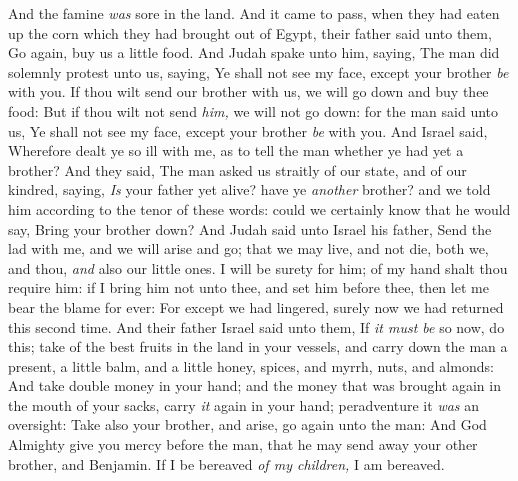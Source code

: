 \documentclass[11pt,letterpaper,oneside]{memoir}
\begin{document}
And the famine \emph{was} sore in the land. And it came to pass, when
they had eaten up the corn which they had brought out of Egypt, their
father said unto them, Go again, buy us a little food. And Judah spake
unto him, saying, The man did solemnly protest unto us, saying, Ye shall
not see my face, except your brother \emph{be} with you. If thou wilt
send our brother with us, we will go down and buy thee food: But if thou
wilt not send \emph{him,} we will not go down: for the man said unto us,
Ye shall not see my face, except your brother \emph{be} with you. And
Israel said, Wherefore dealt ye so ill with me, as to tell the man
whether ye had yet a brother? And they said, The man asked us straitly
of our state, and of our kindred, saying, \emph{Is} your father yet
alive? have ye \emph{another} brother? and we told him according to the
tenor of these words: could we certainly know that he would say, Bring
your brother down? And Judah said unto Israel his father, Send the lad
with me, and we will arise and go; that we may live, and not die, both
we, and thou, \emph{and} also our little ones. I will be surety for him;
of my hand shalt thou require him: if I bring him not unto thee, and set
him before thee, then let me bear the blame for ever: For except we had
lingered, surely now we had returned this second time. And their father
Israel said unto them, If \emph{it must be} so now, do this; take of the
best fruits in the land in your vessels, and carry down the man a
present, a little balm, and a little honey, spices, and myrrh, nuts, and
almonds: And take double money in your hand; and the money that was
brought again in the mouth of your sacks, carry \emph{it} again in your
hand; peradventure it \emph{was} an oversight: Take also your brother,
and arise, go again unto the man: And God Almighty give you mercy before
the man, that he may send away your other brother, and Benjamin. If I be
bereaved \emph{of my children,} I am bereaved.
\end{document}
